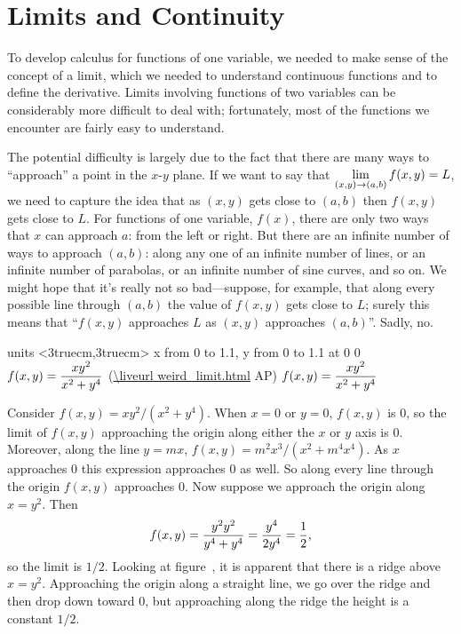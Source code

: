\section{Limits and Continuity}{}{}

To develop calculus for functions of one variable, we needed to make
sense of the concept of a limit, which we needed to understand
continuous functions and to define the derivative. Limits involving
functions of two variables can be considerably more difficult to deal
with; fortunately, most of the functions we encounter are fairly easy
to understand.

The potential difficulty is largely due to the fact that there are
many ways to ``approach'' a point in the $x$-$y$ plane. If we want to
say that $\displaystyle\lim_{(x,y)\to(a,b)}f(x,y)=L$, we need to capture the
idea that as $(x,y)$ gets close to $(a,b)$ then $f(x,y)$ gets close to
$L$. For functions of one variable, $f(x)$, there are only two ways
that $x$ can approach $a$: from the left or right. But there are an
infinite number of ways to approach $(a,b)$: along any one of an
infinite number of lines, or an infinite number of parabolas, or an
infinite number of sine curves, and so on. We might hope that it's
really not so bad---suppose, for example, that along every possible
line through $(a,b)$ the value of $f(x,y)$ gets close to $L$; surely
this means that ``$f(x,y)$ approaches $L$ as $(x,y)$ approaches
$(a,b)$''. Sadly, no.

\figure
\texonly
\vbox{\beginpicture
\normalgraphs
\ninepoint
\setcoordinatesystem units <3truecm,3truecm>
\setplotarea x from 0 to 1.1, y from 0 to 1.1
 at 0 0
\endpicture}
\begincaption
$\displaystyle f(x,y)={xy^2\over x^2+y^4}$
(\expandafter\url\expandafter{\liveurl weird_limit.html}%
AP\endurl)
\endcaption
\endtexonly
{}
\htmlonly
\begincaption
$\displaystyle f(x,y)={xy^2\over x^2+y^4}$
\endcaption
\endhtmlonly
\endfigure

\example Consider $f(x,y)=xy^2/(x^2+y^4)$. When
$x=0$ or $y=0$, $f(x,y)$ is 0, so the limit of $f(x,y)$ approaching the
origin along either the $x$ or $y$ axis is 0. Moreover, along the line
$y=mx$, $f(x,y)=m^2x^3/(x^2+m^4x^4)$. As $x$ approaches 0 this expression
approaches 0 as well. So along every line through the origin $f(x,y)$
approaches 0. Now suppose we approach the origin along $x=y^2$. Then 
$$f(x,y)={y^2y^2\over y^4+y^4}={y^4\over2y^4}={1\over2},$$
so the limit is $1/2$. Looking at figure~, it
is apparent that there is a ridge above $x=y^2$. Approaching the
origin along a straight line, we go over the ridge and then drop down
toward 0, but approaching along the ridge the height is a constant
$1/2$. 
\endexample

